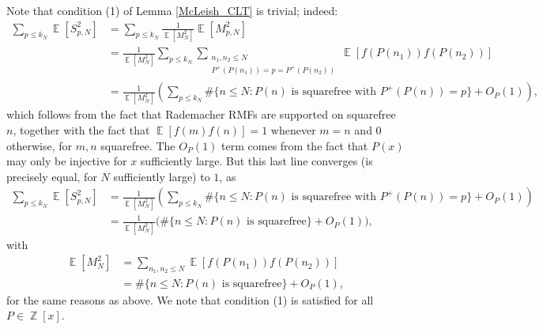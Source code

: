 \documentclass[11pts]{amsart}
\numberwithin{equation}{section}
\DeclareMathOperator{\E}{\mathbb{E}}
\DeclareMathOperator{\Z}{\mathbb{Z}}
\begin{document}
Note that condition (1) of Lemma \ref{McLeish_CLT} is trivial; indeed:
\begin{align*}
    \sum_{p\leq k_N}\E\left[S_{p,N}^2\right]
    &=
    \sum_{p\leq k_N}\frac{1}{\E\left[M_N^2\right]}\E\left[M_{p,N}^2\right]\\
    &=
    \frac{1}{\E\left[M_N^2\right]}\sum_{p\leq k_N}\sum_{\substack{{n_1,n_2\leq N}\\{P^+(P(n_1))=p=P^+(P(n_2))}}}\E\left[f(P(n_1))f(P(n_2))\right]\\
    &=
    \frac{1}{\E\left[M_N^2\right]}\left(\sum_{p\leq k_N}\#\{n\leq N:\text{$P(n)$ is squarefree with $P^+(P(n))=p$}\} + O_P(1)\right),
\end{align*}
which follows from the fact that Rademacher RMFs are supported on squarefree $n$, together with the fact that $\E\left[f(m)f(n)\right]=1$ whenever $m=n$ and $0$ otherwise, for $m,n$ squarefree. The $O_P(1)$ term comes from the fact that $P(x)$ may only be injective for $x$ sufficiently large. But this last line converges (is precisely equal, for $N$ sufficiently large) to $1$, as
\begin{align*}
        \sum_{p\leq k_N}\E\left[S_{p,N}^2\right]
        &=
        \frac{1}{\E\left[M_N^2\right]}\left(\sum_{p\leq k_N}\#\{n\leq N:\text{$P(n)$ is squarefree with $P^+(P(n))=p$}\}+O_P(1)\right)\\
        &=
        \frac{1}{\E\left[M_N^2\right]}\Big(\#\{n\leq N:\text{$P(n)$ is squarefree}\}+O_P(1)\Big),
\end{align*}
with
\begin{align*}
    \E\left[M_N^2\right]
    &=
    \sum_{n_1,n_2\leq N}\E\left[f(P(n_1))f(P(n_2))\right]\\
    &=
    \#\{n\leq N: \text{$P(n)$ is squarefree}\}+O_P(1),
\end{align*}
for the same reasons as above. We note that condition (1) is satisfied for all $P\in\Z[x]$.
\end{document}
